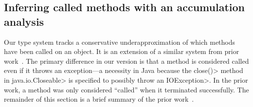 


\subsection{Inferring called methods with an accumulation analysis}
\label{sec:called-methods}


Our type system tracks a conservative underapproximation of which methods have been called on an object.
It is an extension of a similar system
from prior work~\cite{KelloggRSSE2020}.  The primary difference in our
version is that a method is considered called even if it throws an
exception---a necessity in Java because the \<close()> method
in \<java.io.Closeable> is specified to possibly throw an \<IOException>.
In the prior work, a method was only considered ``called'' when it terminated
successfully.
The remainder of this section is a brief summary
of the prior work~\cite{KelloggRSSE2020}.


